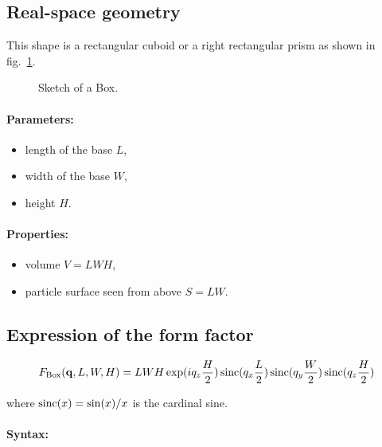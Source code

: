 \subsection{Real-space geometry}
This shape is a rectangular cuboid or a right rectangular prism as
shown in fig.~\ref{box}. 

\begin{figure}[ht]
\begin{center}
\caption{Sketch of a Box.}
\end{center}
\label{box}
\end{figure}


\paragraph{Parameters:}
\begin{itemize}
\item length of the base $L$,
\item width of the base $W$,
\item height  $H$.
\end{itemize}

\paragraph{Properties:}
\begin{itemize}
\item volume $V= LWH$,
\item particle surface seen from above $S = LW$.
\end{itemize}

\subsection{Expression of the form factor}

\begin{equation*}
F_{\rm{Box}}(\mathbf{q},L,W,H)= L W H\exp(i q_z \frac{H}{2}) \operatorname{sinc}(q_x \frac{L}{2})
\operatorname{sinc}(q_y \frac{W}{2}) \operatorname{sinc}(q_z \frac{H}{2})
\end{equation*}
    
where $\operatorname{sinc}(x)=\sin(x)/x$ is the cardinal sine.

\paragraph{Syntax:} 

